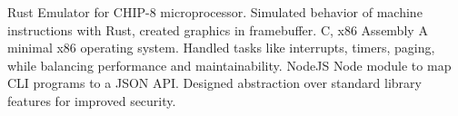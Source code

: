 \documentclass{article}
\begin{document}
\normalsize
{}
{Rust}
{Emulator for CHIP-8 microprocessor. Simulated behavior of machine instructions with
Rust, created graphics in framebuffer.}
\vspace{1.5mm}
{C, x86 Assembly}
{A minimal x86 operating system. Handled tasks like interrupts, timers,
paging, while balancing performance and maintainability.}
\vspace{1.5mm}
{NodeJS}
{Node module to map CLI programs to a JSON API. Designed abstraction over standard
library features for improved security.}
\vspace{-2mm}
\end{document}
